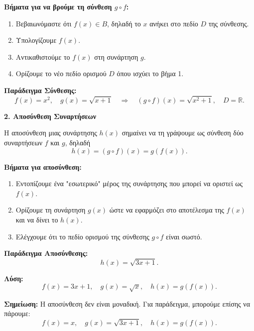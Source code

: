 \textbf{Βήματα για να βρούμε τη σύνθεση $g \circ f$:}
\begin{enumerate}
  \item Βεβαιωνόμαστε ότι $f(x) \in B$, δηλαδή το $x$ ανήκει στο πεδίο $D$ της σύνθεσης.
  \item Υπολογίζουμε $f(x)$.
  \item Αντικαθιστούμε το $f(x)$ στη συνάρτηση $g$.
  \item Ορίζουμε το νέο πεδίο ορισμού $D$ όπου ισχύει το βήμα 1.
\end{enumerate}

\vspace{1em}

\textbf{Παράδειγμα Σύνθεσης:}
\[
f(x) = x^2, \quad g(x) = \sqrt{x+1} \quad \Rightarrow \quad (g \circ f)(x) = \sqrt{x^2+1}, \quad D = \mathbb{R}.
\]

\vspace{1em}

\textbf{2. Αποσύνθεση Συναρτήσεων}

Η αποσύνθεση μιας συνάρτησης $h(x)$ σημαίνει να τη γράψουμε ως σύνθεση δύο συναρτήσεων $f$ και $g$, δηλαδή
\[
h(x) = (g \circ f)(x) = g(f(x)).
\]

\vspace{0.5em}

\textbf{Βήματα για αποσύνθεση:}
\begin{enumerate}
  \item Εντοπίζουμε ένα "εσωτερικό" μέρος της συνάρτησης που μπορεί να οριστεί ως $f(x)$.
  \item Ορίζουμε τη συνάρτηση $g(x)$ ώστε να εφαρμόζει στο αποτέλεσμα της $f(x)$ και να δίνει το $h(x)$.
  \item Ελέγχουμε ότι το πεδίο ορισμού της σύνθεσης $g \circ f$ είναι σωστό.
\end{enumerate}

\vspace{1em}

\textbf{Παράδειγμα Αποσύνθεσης:}
\[
h(x) = \sqrt{3x+1}.
\]

\textbf{Λύση:}
\[
f(x) = 3x+1, \quad g(x) = \sqrt{x}, \quad h(x) = g(f(x)).
\]

\vspace{0.5em}

\textbf{Σημείωση:} Η αποσύνθεση δεν είναι μοναδική. Για παράδειγμα, μπορούμε επίσης να πάρουμε:
\[
f(x) = x, \quad g(x) = \sqrt{3x+1}, \quad h(x) = g(f(x)).
\]
